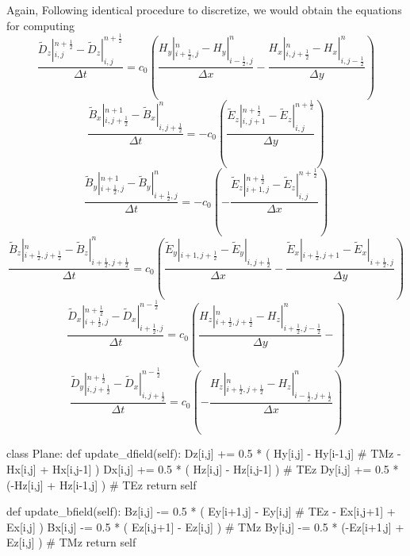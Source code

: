 Again, Following identical procedure to discretize, we would obtain the equations for computing
\begin{displaymath}
  \frac{\widetilde{D}_z|_{i,j}^{n+\frac{1}{2}}-\widetilde{D}_z|_{i,j}^{n+\frac{1}{2}}}{\Delta t} =
  c_0 \left(\frac{H_y|_{i+\frac{1}{2},j}^{n} - H_y|_{i-\frac{1}{2},j}^n}{\Delta x} - \frac{H_x|_{i,j+\frac{1}{2}}^{n} - H_x|_{i,j-\frac{1}{2}}^{n}}{\Delta y}\right)
\end{displaymath}
\begin{displaymath}
  \frac{\widetilde{B}_x|_{i,j+\frac{1}{2}}^{n+1} - \widetilde{B}_x|_{i,j+\frac{1}{2}}^{n}}{\Delta t} = 
  - c_0\left(\frac{\widetilde{E}_z|_{i,j+1}^{n+\frac{1}{2}} - \widetilde{E}_z|_{i,j}^{n+\frac{1}{2}}}{\Delta y}\right)
\end{displaymath}
\begin{displaymath}
  \frac{\widetilde{B}_y|_{i+\frac{1}{2},j}^{n+1} - \widetilde{B}_y|_{i+\frac{1}{2},j}^{n}}{\Delta t} =
  - c_0\left( - \frac{\widetilde{E}_z|_{i+1,j}^{n+\frac{1}{2}} - \widetilde{E}_z|_{i,j}^{n+\frac{1}{2}}}{\Delta x}\right)
\end{displaymath}
\begin{displaymath}
  \frac{\widetilde{B}_z|_{i+\frac{1}{2},j+\frac{1}{2}}^{n} - \widetilde{B}_z|_{i+\frac{1}{2},j+\frac{1}{2}}^{n}}{\Delta t} =
  c_0\left(\frac{\widetilde{E}_y|_{i+1,j+\frac{1}{2}}^{} - \widetilde{E}_y|_{i,j+\frac{1}{2}}^{}}{\Delta x} - \frac{\widetilde{E}_x|_{i+\frac{1}{2},j+1}^{} - \widetilde{E}_x|_{i+\frac{1}{2},j}^{}}{\Delta y}\right)
\end{displaymath}
\begin{displaymath}
  \frac{\widetilde{D}_x|_{i+\frac{1}{2},j}^{n+\frac{1}{2}} - \widetilde{D}_x|_{i+\frac{1}{2},j}^{n-\frac{1}{2}}}{\Delta t} =
  c_0\left(\frac{H_z|_{i+\frac{1}{2},j+\frac{1}{2}}^{n} - H_z|_{i+\frac{1}{2},j-\frac{1}{2}}^{n}}{\Delta y} - \right)
\end{displaymath}
\begin{displaymath}
  \frac{\widetilde{D}_y|_{i,j+\frac{1}{2}}^{n+\frac{1}{2}} - \widetilde{D}_x|_{i,j+\frac{1}{2}}^{n-\frac{1}{2}}}{\Delta t} =
  c_0\left( - \frac{H_z|_{i+\frac{1}{2},j+\frac{1}{2}}^{n} - H_z|_{i-\frac{1}{2},j+\frac{1}{2}}^{n}}{\Delta x}\right)
\end{displaymath}


\begin{code}
class Plane:
    def update\_dfield(self):
        Dz[i,j] += 0.5 * ( Hy[i,j] - Hy[i-1,j]   # TMz
                         - Hx[i,j] + Hx[i,j-1] )
        Dx[i,j] += 0.5 * ( Hz[i,j] - Hz[i,j-1] ) # TEz
        Dy[i,j] += 0.5 * (-Hz[i,j] + Hz[i-1,j] ) # TEz
        return self

    def update\_bfield(self):
        Bz[i,j] -= 0.5 * ( Ey[i+1,j] - Ey[i,j]   # TEz
                         - Ex[i,j+1] + Ex[i,j] ) 
        Bx[i,j] -= 0.5 * ( Ez[i,j+1] - Ez[i,j] ) # TMz
        By[i,j] -= 0.5 * (-Ez[i+1,j] + Ez[i,j] ) # TMz
        return self
\end{code}






